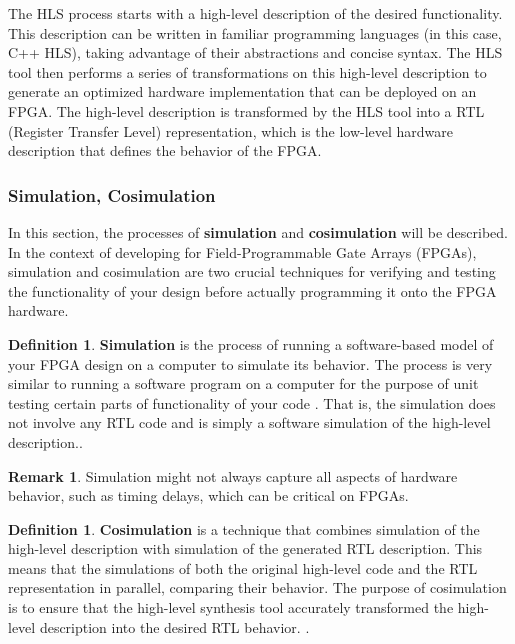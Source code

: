 \documentclass[a4paper, twoside]{report}
\theoremstyle{definition}
\newtheorem{definition}[theorem]{Definition}
\newtheorem{remark}[theorem]{Remark}
\numberwithin{equation}{section}
\begin{document}
The HLS process starts with a high-level description of the desired functionality.
This description can be written in familiar programming languages (in this case, C++ HLS),
taking advantage of their abstractions and concise syntax.
The HLS tool then performs a series of transformations on this high-level description to generate
an optimized hardware implementation that can be deployed on an FPGA.
The high-level description is transformed by the HLS tool into a RTL (Register Transfer Level) representation,
which is the low-level hardware description that defines the behavior of the FPGA.


\subsubsection{Simulation, Cosimulation}

In this section, the processes of \textbf{simulation} and \textbf{cosimulation} will be described.
In the context of developing for Field-Programmable Gate Arrays (FPGAs),
simulation and cosimulation are two crucial techniques for verifying and testing the
functionality of your design before actually programming it onto the FPGA hardware.

\begin{definition}
    \textbf{Simulation} is the process of running a software-based model of your FPGA design on
    a computer to simulate its behavior.
    The process is very similar to running a software program on a computer for
    the purpose of unit testing certain parts of functionality of your code
    \cite{AMD2023VitisSimCosim}. That is, the simulation does not
    involve any RTL code and is simply a software simulation of the high-level description..
\end{definition}

\begin{remark}
    Simulation might not always capture all aspects of hardware behavior, such as timing delays, which can be critical on FPGAs.
\end{remark}

\begin{definition}
    \textbf{Cosimulation} is a technique that combines simulation of the high-level description with simulation of the generated RTL description.
    This means that the simulations of both the original high-level code and the RTL representation in parallel, comparing their behavior.
    The purpose of cosimulation is to ensure that the high-level synthesis tool accurately transformed the high-level description into the desired RTL behavior.
    \cite{AMD2023VitisSimCosim}.
\end{definition}
\end{document}
